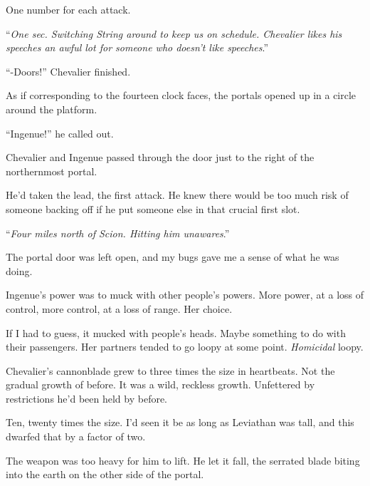 One number for each attack.



``\emph{One sec.  Switching String around to keep us on schedule.  Chevalier likes his speeches an awful lot for someone who doesn't like speeches}.''



``-Doors!''  Chevalier finished.



As if corresponding to the fourteen clock faces, the portals opened up in a circle around the platform.



``Ingenue!'' he called out.



Chevalier and Ingenue passed through the door just to the right of the northernmost portal.



He'd taken the lead, the first attack.  He knew there would be too much risk of someone backing off if he put someone else in that crucial first slot.



``\emph{Four miles north of Scion.  Hitting him unawares}.''



The portal door was left open, and my bugs gave me a sense of what he was doing.



Ingenue's power was to muck with other people's powers.  More power, at a loss of control, more control, at a loss of range.  Her choice.



If I had to guess, it mucked with people's heads.  Maybe something to do with their passengers.  Her partners tended to go loopy at some point.  \emph{Homicidal} loopy.



Chevalier's cannonblade grew to three times the size in heartbeats.  Not the gradual growth of before.  It was a wild, reckless growth.  Unfettered by restrictions he'd been held by before.



Ten, twenty times the size.  I'd seen it be as long as Leviathan was tall, and this dwarfed that by a factor of two.



The weapon was too heavy for him to lift.  He let it fall, the serrated blade biting into the earth on the other side of the portal.



